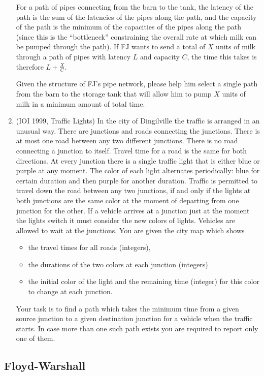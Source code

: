 \documentclass[11pt]{book}
\begin{document}
\begin{enumerate}
For a path of pipes connecting from the barn to the tank, the latency
of the path is the sum of the latencies of the pipes along the path,
and the capacity of the path is the minimum of the capacities of the
pipes along the path (since this is the ``bottleneck'' constraining the
overall rate at which milk can be pumped through the path).  If FJ
wants to send a total of $X$ units of milk through a path of pipes with
latency $L$ and capacity $C$, the time this takes is therefore $L + \frac{X}{C}$.

Given the structure of FJ's pipe network, please help him select a single
path from the barn to the storage tank that will allow him to pump $X$ units
of milk in a minimum amount of total time.

\item
(IOI 1999, Traffic Lights)
In the city of Dingilville the traffic is arranged in an unusual way. There are junctions
and roads connecting the junctions. There is at most one road between any two different junctions. There is no
road connecting a junction to itself. Travel time for a road is the same for both directions. At every junction
there is a single traffic light that is either blue or purple at any moment. The color of each light alternates
periodically: blue for certain duration and then purple for another duration. Traffic is permitted to travel
down the road between any two junctions, if and only if the lights at both junctions are the same color at the
moment of departing from one junction for the other. If a vehicle arrives at a junction just at the moment the
lights switch it must consider the new colors of lights. Vehicles are allowed to wait at the junctions. You are
given the city map which shows
\begin{itemize}
\item
the travel times for all roads (integers),
\item
the durations of the two colors at each junction (integers)
\item
the initial color of the light and the remaining time (integer) for this color to change at each junction.
\end{itemize}
Your task is to find a path which takes the minimum time from a given source junction to a given destination
junction for a vehicle when the traffic starts. In case more than one such path exists you are required to report
only one of them.
\end{enumerate}

\subsection{Floyd-Warshall}
\end{document}
